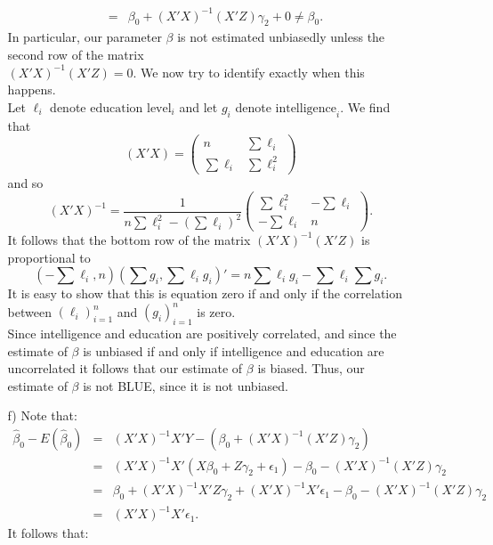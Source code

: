 \documentclass{article}
\begin{document}
\begin{itemize}
\begin{itemize}
\begin{eqnarray*}
        & = & \beta_0 + (X'X)^{-1}(X'Z)\gamma_2 + 0 \neq \beta_0.
      \end{eqnarray*}
      In particular, our parameter $\beta$ is not estimated 
      unbiasedly unless the second row of the matrix\\
      $(X'X)^{-1}(X'Z) = 0$.  
      We now try to identify exactly when this happens. \\
      Let $\ell_i$ denote $\text{education level}_i$ and let
      $g_i$ denote $\text{intelligence}_i$.
      We find that 
      $$
        (X'X) = \left(
          \begin{array}{cc}
            n & \sum \ell_i\\
            \sum \ell_i & \sum \ell_i^2
          \end{array}
        \right)
      $$
      and so
      $$
        (X'X)^{-1} = \frac{1}{n\sum \ell_i^2- (\sum \ell_i)^2}
        \left(
          \begin{array}{cc}
            \sum \ell_i^2 & - \sum \ell_i \\
            -\sum \ell_i & n
          \end{array}
        \right).
      $$
      It follows that the bottom row of the matrix $(X'X)^{-1}(X'Z)$ is proportional to
      $$
        (-\sum \ell_i, n)(\sum g_i,\sum \ell_ig_i)' = n\sum \ell_ig_i - \sum \ell_i\sum g_i.
      $$
      It is easy to show that this is equation zero if and only if the correlation between 
      $(\ell_i)_{i=1}^n$ and $(g_i)_{i=1}^n$ is zero.\\[1ex]
      Since intelligence and education are positively correlated, and since the estimate of $\beta$ is unbiased
      if and only if intelligence and education are uncorrelated
      it follows that our estimate of $\beta$ is biased.      
      Thus, our estimate of $\beta$ is not BLUE, since it is not unbiased.
    \item[f)]  Note that:
      \begin{eqnarray*}
        \hat \beta_0 - E(\hat \beta_0) &=& (X'X)^{-1}X'Y - (\beta_0 + (X'X)^{-1}(X'Z)\gamma_2) \\
        &=& (X'X)^{-1}X'(X\beta_0 + Z\gamma_2 + \epsilon_{1}) - \beta_0 -(X'X)^{-1}(X'Z)\gamma_2\\
        &=&\beta_0 +(X'X)^{-1}X'Z\gamma_2 + (X'X)^{-1}X'\epsilon_1 - \beta_0 - (X'X)^{-1}(X'Z)\gamma_2\\
        &=& (X'X)^{-1}X'\epsilon_1.
      \end{eqnarray*}
      It follows that:
      \begin{eqnarray*}

\end{eqnarray*}
\end{itemize}
\end{itemize}
\end{document}
